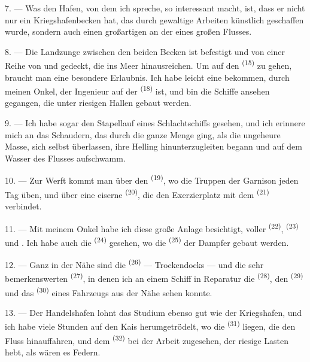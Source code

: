 \VUsaut{3.0mm}
\VUsaut{3.0mm}

7. --- Was den Hafen, von dem ich spreche, so interessant macht, ist, dass er nicht
nur ein Kriegshafenbecken hat, das durch gewaltige Arbeiten künstlich geschaffen
wurde, sondern auch einen großartigen  an der 
eines großen Flusses.

8. --- Die Landzunge zwischen den beiden Becken ist befestigt und von einer Reihe
von  und  gedeckt, die ins Meer hinausreichen.
Um auf den  \textsuperscript{(15)} zu gehen, braucht man eine
besondere Erlaubnis. Ich habe leicht eine bekommen, durch meinen Onkel, der
Ingenieur auf der  \textsuperscript{(18)} ist, und bin die Schiffe
ansehen gegangen, die unter riesigen Hallen gebaut werden.

9. --- Ich habe sogar den Stapellauf eines Schlachtschiffs gesehen, und ich erinnere
mich an das Schaudern, das durch die ganze Menge ging, als die ungeheure Masse, sich
selbst überlassen, ihre Helling hinunterzugleiten begann und auf dem Wasser des
Flusses aufschwamm.

10. --- Zur Werft kommt man über den  \textsuperscript{(19)},
wo die Truppen der Garnison jeden Tag üben, und über eine eiserne
 \textsuperscript{(20)}, die den Exerzierplatz mit dem
 \textsuperscript{(21)} verbindet.

\VUsaut{3.0mm}
\VUsaut{3.0mm}

11. --- Mit meinem Onkel habe ich diese große Anlage besichtigt, voller
 \textsuperscript{(22)}, 
\textsuperscript{(23)} und . Ich habe auch die
 \textsuperscript{(24)} gesehen, wo die 
\textsuperscript{(25)} der Dampfer gebaut werden.

12. --- Ganz in der Nähe sind die  \textsuperscript{(26)} --- Trockendocks
--- und die sehr bemerkenswerten  \textsuperscript{(27)}, in
denen ich an einem Schiff in Reparatur die 
\textsuperscript{(28)}, den  \textsuperscript{(29)} und das
 \textsuperscript{(30)} eines Fahrzeugs aus der Nähe sehen konnte.

13. --- Der Handelshafen lohnt das Studium ebenso gut wie der Kriegshafen, und ich
habe viele Stunden auf den Kais herumgetrödelt, wo die 
\textsuperscript{(31)} liegen, die den Fluss hinauffahren, und dem
 \textsuperscript{(32)} bei der Arbeit zugesehen, der riesige
Lasten hebt, als wären es Federn.

